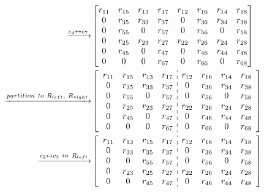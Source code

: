 \documentclass[12pt]{article}
\begin{document}
\begin{align*}
\xrightarrow{c_{4} \leftrightarrow c_{7}}
&\begin{bmatrix}
 r_{11} & r_{15} & r_{13} & r_{17} & r_{12} & r_{16} & r_{14} & r_{18}\\
 0      & r_{35} & r_{33} & r_{37} & 0      & r_{36} & r_{34} & r_{38}\\
 0      & r_{55} & 0      & r_{57} & 0      & r_{56} & 0      & r_{58}\\
 0      & r_{25} & r_{23} & r_{27} & r_{22} & r_{26} & r_{24} & r_{28}\\
 0      & r_{45} & 0      & r_{47} & 0      & r_{46} & r_{44} & r_{48}\\
 0      & 0      & 0      & r_{67} & 0      & r_{66} & 0      & r_{68}\\
\end{bmatrix}\\
\xrightarrow{partition\ to\ R_{left},\ R_{right}}
&\begin{bmatrix}
\begin{array}{cccc:cccc}
 r_{11} & r_{15} & r_{13} & r_{17} & r_{12} & r_{16} & r_{14} & r_{18}\\
 0      & r_{35} & r_{33} & r_{37} & 0      & r_{36} & r_{34} & r_{38}\\
 0      & r_{55} & 0      & r_{57} & 0      & r_{56} & 0      & r_{58}\\
 0      & r_{25} & r_{23} & r_{27} & r_{22} & r_{26} & r_{24} & r_{28}\\
 0      & r_{45} & 0      & r_{47} & 0      & r_{46} & r_{44} & r_{48}\\
 0      & 0      & 0      & r_{67} & 0      & r_{66} & 0      & r_{68}\\
\end{array}
\end{bmatrix}\\
\xrightarrow{c_{2} \leftrightarrow c_{3}\ in\ R_{left}}
&\begin{bmatrix}
\begin{array}{cccc:cccc}
 r_{11} & r_{13} & r_{15} & r_{17} & r_{12} & r_{16} & r_{14} & r_{18}\\
 0      & r_{33} & r_{35} & r_{37} & 0      & r_{36} & r_{34} & r_{38}\\
 0      & 0      & r_{55} & r_{57} & 0      & r_{56} & 0      & r_{58}\\
 0      & r_{23} & r_{25} & r_{27} & r_{22} & r_{26} & r_{24} & r_{28}\\
 0      & 0      & r_{45} & r_{47} & 0      & r_{46} & r_{44} & r_{48}\\

\end{array}
\end{bmatrix}
\end{align*}
\end{document}
